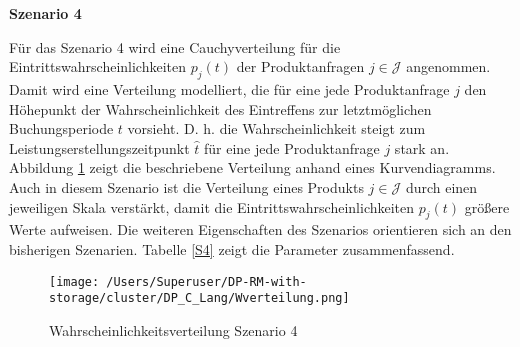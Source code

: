 \newpage

\textbf{Szenario 4}

Für das Szenario 4 wird eine Cauchyverteilung für die Eintrittswahrscheinlichkeiten $p_j(t)$ der Produktanfragen $j\in\mathcal{J}$ angenommen. Damit wird eine Verteilung modelliert, die für eine jede Produktanfrage $j$ den Höhepunkt der Wahrscheinlichkeit des Eintreffens zur letztmöglichen Buchungsperiode $t$ vorsieht. D. h. die Wahrscheinlichkeit steigt zum Leistungserstellungszeitpunkt $\hat t$ für eine jede Produktanfrage $j$ stark an. Abbildung \ref{SB4} zeigt die beschriebene Verteilung anhand eines Kurvendiagramms. Auch in diesem Szenario ist die Verteilung eines Produkts $j\in\mathcal{J}$ durch einen jeweiligen Skala verstärkt, damit die Eintrittswahrscheinlichkeiten $p_j(t)$ größere Werte aufweisen. Die weiteren Eigenschaften des Szenarios orientieren sich an den bisherigen Szenarien. Tabelle \ref{S4} zeigt die Parameter  zusammenfassend.

\begin{figure}[h!]
  \begin{center}
    \texttt{[image: /Users/Superuser/DP-RM-with-storage/cluster/DP\_C\_Lang/Wverteilung.png]}
    \caption{Wahrscheinlichkeitsverteilung Szenario 4}  \label{SB4}
  \end{center}
\end{figure}


